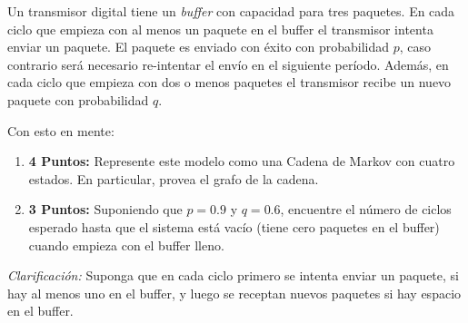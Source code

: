 \documentclass[ a4paper, twoside, 11pt]{article}
\begin{document}
\begin{problem}
Un transmisor digital tiene un \emph{buffer} con capacidad para tres paquetes. \linebreak En cada ciclo que empieza con al menos un paquete en el buffer el transmisor intenta enviar un paquete. El paquete es enviado con \'exito con probabilidad $p$, caso contrario ser\'a necesario re-intentar el env\'io en el siguiente per\'iodo. Adem\'as, en cada ciclo que empieza con dos o menos paquetes el transmisor recibe un nuevo paquete con probabilidad $q$. 

Con esto en mente: 
\begin{enumerate}[label=\textbf{\alph*)}]
\item \textbf{4 Puntos:} Represente este modelo como una Cadena de Markov con cuatro estados. \linebreak En particular, provea el grafo de la cadena. 
\item \textbf{3 Puntos:} Suponiendo que $p = 0.9$ y $q = 0.6$, encuentre el n\'umero de ciclos esperado hasta que el sistema est\'a vac\'io (\ie tiene cero paquetes en el buffer) cuando empieza con el buffer lleno. 
\end{enumerate}

\emph{Clarificaci\'on:} Suponga que en cada ciclo primero se intenta enviar un paquete, si hay al menos uno en el buffer, y luego se receptan nuevos paquetes si hay espacio en el buffer. 

\end{problem}
\fullskip
\end{document}
